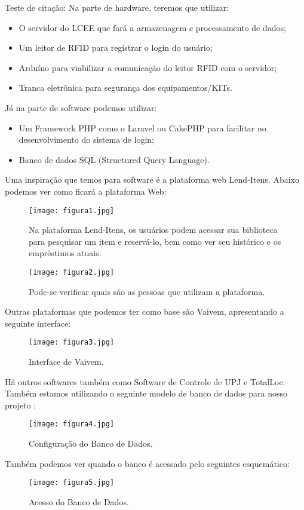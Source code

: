 \vspace{-42pt}
Teste de citação: \cite{DepEngEle}
Na parte de hardware, teremos que utilizar:
\begin{itemize}
   \item O servidor do LCEE que fará a armazenagem e processamento de dados; 
   \item Um leitor de RFID para registrar o login do usuário;
   \item Arduíno para viabilizar a comunicação do leitor RFID com o servidor;
   \item Tranca eletrônica para segurança dos equipamentos/KITs.
\end{itemize}
Já na parte de software podemos utilizar:
\begin{itemize}
   \item Um Framework PHP como o Laravel ou CakePHP para facilitar no desenvolvimento do sistema de login; 
   \item Banco de dados SQL (Structured Query Language).
\end{itemize}

Uma inspiração que temos para software é a plataforma web Lend-Itens. Abaixo podemos ver como ficará a plataforma Web:

\begin{figure}[!h]
	\centering
	\caption{Na plataforma Lend-Itens, os usuários podem acessar sua biblioteca para pesquisar um item e reservá-lo, bem como ver seu histórico e os empréstimos atuais.}
	\texttt{[image: figura1.jpg]}
	\label{fig:label_da_figura}
\end{figure}

\begin{figure}[!h]
	\centering
	\caption{Pode-se verificar quais são as pessoas que utilizam a plataforma.}
	\texttt{[image: figura2.jpg]}
	\label{fig:label_da_figura}
\end{figure}

Outras plataformas que podemos ter como base são Vaivem, apresentando a seguinte interface:

\begin{figure}[!h]
	\centering
	\caption{Interface de Vaivem.}
	\texttt{[image: figura3.jpg]}
	\label{fig:label_da_figura}
\end{figure}


Há outros softwares também como Software de Controle de UPJ e TotalLoc.
Também estamos utilizando o seguinte modelo de banco de dados para nosso projeto :
\begin{figure}[!h]
	\centering
	\caption{Configuração do Banco de Dados.}
	\texttt{[image: figura4.jpg]}
	\label{fig:label_da_figura}
\end{figure}


Também podemos ver quando o banco é acessado pelo seguintes esquemático:

\begin{figure}[!h]
	\centering
	\caption{Acesso do Banco de Dados.}
	\texttt{[image: figura5.jpg]}
	\label{fig:label_da_figura}
\end{figure}

